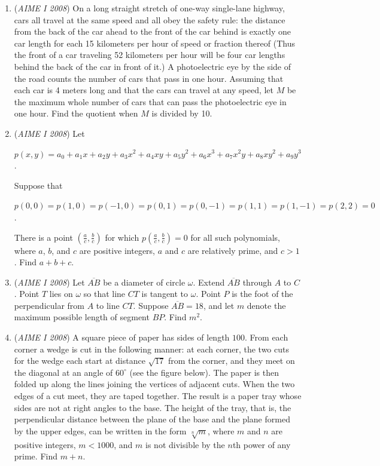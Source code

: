 \begin{enumerate}
 

	\item (\textit{AIME I 2008}) On a long straight stretch of one-way single-lane highway, cars all travel at the same speed and all obey the safety rule: the distance from the back of the car ahead to the front of the car behind is exactly one car length for each 15 kilometers per hour of speed or fraction thereof (Thus the front of a car traveling 52 kilometers per hour will be four car lengths behind the back of the car in front of it.) A photoelectric eye by the side of the road counts the number of cars that pass in one hour. Assuming that each car is 4 meters long and that the cars can travel at any speed, let $M$ be the maximum whole number of cars that can pass the photoelectric eye in one hour. Find the quotient when $M$ is divided by 10.


 

	\item (\textit{AIME I 2008}) Let


 $p(x,y) = a_0 + a_1x + a_2y + a_3x^2 + a_4xy + a_5y^2 + a_6x^3 + a_7x^2y + a_8xy^2 + a_9y^3$.


 Suppose that 


 $p(0,0) = p(1,0) = p( - 1,0) = p(0,1) = p(0, - 1) = p(1,1) = p(1, - 1) = p(2,2) = 0$.


 There is a point $\left(\frac {a}{c},\frac {b}{c}\right)$ for which $p\left(\frac {a}{c},\frac {b}{c}\right) = 0$ for all such polynomials, where $a$, $b$, and $c$ are positive integers, $a$ and $c$ are relatively prime, and $c > 1$.  Find $a + b + c$.


 

	\item (\textit{AIME I 2008}) Let $\overline{AB}$ be a diameter of circle $\omega$. Extend $\overline{AB}$ through $A$ to $C$. Point $T$ lies on $\omega$ so that line $CT$ is tangent to $\omega$. Point $P$ is the foot of the perpendicular from $A$ to line $CT$. Suppose $\overline{AB} = 18$, and let $m$ denote the maximum possible length of segment $BP$. Find $m^{2}$.


 

	\item (\textit{AIME I 2008}) A square piece of paper has sides of length $100$. From each corner a wedge is cut in the following manner: at each corner, the two cuts for the wedge each start at distance $\sqrt {17}$ from the corner, and they meet on the diagonal at an angle of $60^\circ$ (see the figure below). The paper is then folded up along the lines joining the vertices of adjacent cuts. When the two edges of a cut meet, they are taped together. The result is a paper tray whose sides are not at right angles to the base. The height of the tray, that is, the perpendicular distance between the plane of the base and the plane formed by the upper edges, can be written in the form $\sqrt [n]{m}$, where $m$ and $n$ are positive integers, $m < 1000$, and $m$ is not divisible by the $n$th power of any prime. Find $m + n$.



\end{enumerate}
